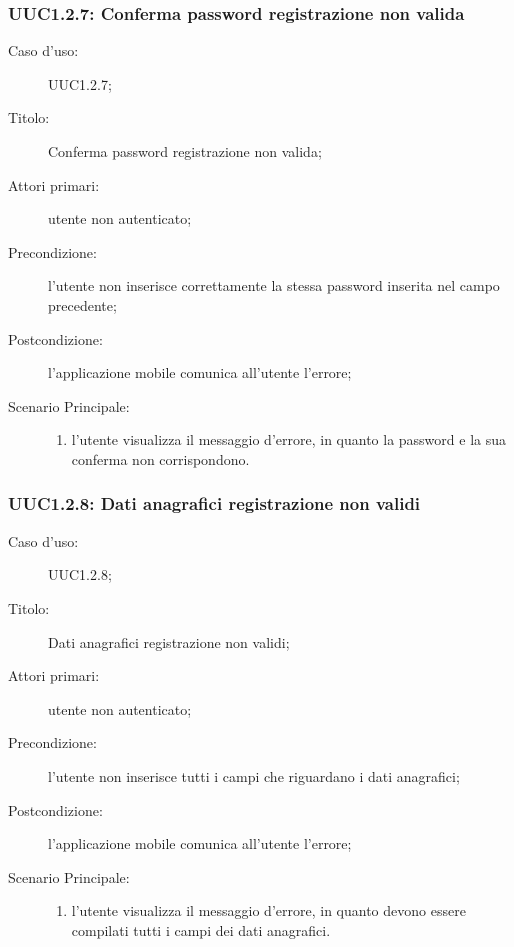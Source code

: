 \documentclass[../../../analisi-dei-requisiti.tex]{subfiles}
\begin{document}
\subsubsection{UUC1.2.7: Conferma password registrazione non valida}%
\label{subs:UUC1.2.7}
\begin{description}
  \item[Caso d’uso:] UUC1.2.7;
  \item[Titolo:] Conferma password registrazione non valida;
  \item[Attori primari:] utente non autenticato;
  \item[Precondizione:] l'utente non inserisce correttamente la stessa password inserita nel campo precedente;
  \item[Postcondizione:] l'applicazione mobile comunica all'utente l'errore;
  \item[Scenario Principale:]
        \begin{enumerate}
          \item l'utente visualizza il messaggio d'errore, in quanto la password e la sua conferma non corrispondono.
        \end{enumerate}
\end{description}

\subsubsection{UUC1.2.8: Dati anagrafici registrazione non validi}%
\label{subs:UUC1.2.8}
\begin{description}
  \item[Caso d’uso:] UUC1.2.8;
  \item[Titolo:] Dati anagrafici registrazione non validi;
  \item[Attori primari:] utente non autenticato;
  \item[Precondizione:] l'utente non inserisce tutti i campi che riguardano i dati anagrafici;
  \item[Postcondizione:] l'applicazione mobile comunica all'utente l'errore;
  \item[Scenario Principale:]
        \begin{enumerate}
          \item l'utente visualizza il messaggio d'errore, in quanto devono essere compilati tutti i campi dei dati anagrafici.
        \end{enumerate}
\end{description}
\end{document}
